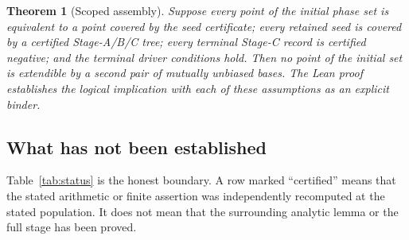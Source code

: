 \documentclass[10pt]{article}
\newtheorem{theorem}{Theorem}
\theoremstyle{definition}
\begin{document}
\begin{theorem}[Scoped assembly]\label{thm:assembly}
Suppose every point of the initial phase set is equivalent to a point covered by the seed certificate; every retained seed is covered by a certified Stage-A/B/C tree; every terminal Stage-C record is certified negative; and the terminal driver conditions hold. Then no point of the initial set is extendible by a second pair of mutually unbiased bases. The Lean proof establishes the logical implication with each of these assumptions as an explicit binder.
\end{theorem}

\subsection{What has not been established}

Table~\ref{tab:status} is the honest boundary. A row marked ``certified'' means that the stated arithmetic or finite assertion was independently recomputed at the stated population. It does not mean that the surrounding analytic lemma or the full stage has been proved.
\end{document}
